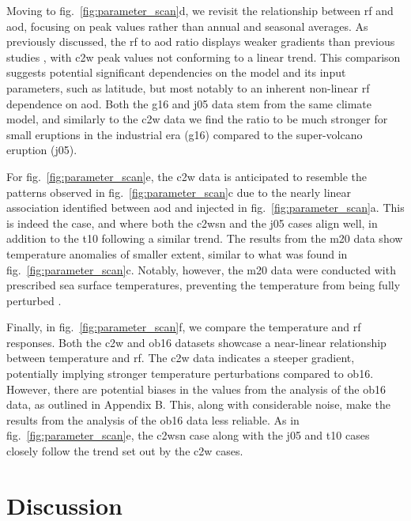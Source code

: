 \documentclass{ametsocV6.1}
\newcommand{\iso}[1][i]{{#1}njected \ce{SO2}}
\begin{document}
Moving to fig.~\ref{fig:parameter_scan}d, we revisit the relationship between \gls{rf}
and \gls{aod}, focusing on peak values rather than annual and seasonal averages. As
previously discussed, the \gls{rf} to \gls{aod} ratio displays weaker gradients than
previous studies \citep{jones2005, marshall2020, timmreck2010}, with \gls{c2w} peak
values not conforming to a linear trend. This comparison suggests potential significant
dependencies on the model and its input parameters, such as latitude, but most notably
to an inherent non-linear \gls{rf} dependence on \gls{aod}. Both the \gls{g16} and
\gls{j05} data stem from the same climate model, and similarly to the \gls{c2w} data we
find the ratio to be much stronger for small eruptions in the industrial era (\gls{g16})
compared to the super-volcano eruption (\gls{j05}).

For fig.~\ref{fig:parameter_scan}e, the \gls{c2w} data is anticipated to resemble the
patterns observed in fig.~\ref{fig:parameter_scan}c due to the nearly linear association
identified between \gls{aod} and \iso{} in fig.~\ref{fig:parameter_scan}a.
This is indeed the case, and where both the \gls{c2wsn} and the \gls{j05} cases
align well, in addition to the \gls{t10} following a similar trend. The results from the
\gls{m20} data show temperature anomalies of smaller extent, similar to what was found
in fig.~\ref{fig:parameter_scan}c. Notably, however, the \gls{m20} data were conducted
with prescribed sea surface temperatures, preventing the temperature from being
fully perturbed \citet{marshall2020}.

Finally, in fig.~\ref{fig:parameter_scan}f, we compare the temperature and \gls{rf}
responses. Both the \gls{c2w} and \gls{ob16} datasets showcase a near-linear
relationship between temperature and \gls{rf}. The \gls{c2w} data indicates a steeper
gradient, potentially implying stronger temperature perturbations compared to
\gls{ob16}. However, there are potential biases in the values from the analysis of the
\gls{ob16} data, as outlined in Appendix B. This, along with considerable noise, make
the results from the analysis of the \gls{ob16} data less reliable. As in
fig.~\ref{fig:parameter_scan}e, the \gls{c2wsn} case along with the \gls{j05} and
\gls{t10} cases closely follow the trend set out by the \gls{c2w} cases.

\section{Discussion}\label{sec:discussion}
\end{document}
